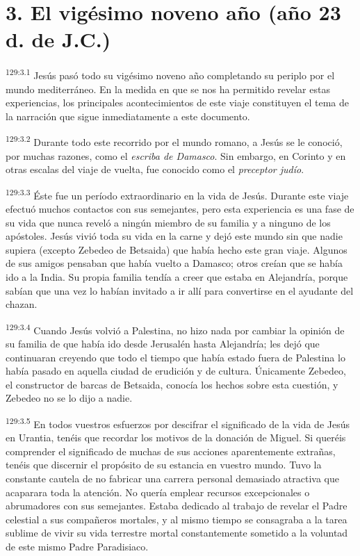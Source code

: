 \section*{3. El vigésimo noveno año (año 23 d. de J.C.)}
\par
\textsuperscript{129:3.1} Jesús pasó todo su vigésimo noveno año completando su periplo por el mundo mediterráneo. En la medida en que se nos ha permitido revelar estas experiencias, los principales acontecimientos de este viaje constituyen el tema de la narración que sigue inmediatamente a este documento.

\par
\textsuperscript{129:3.2} Durante todo este recorrido por el mundo romano, a Jesús se le conoció, por muchas razones, como el \textit{escriba de Damasco}. Sin embargo, en Corinto y en otras escalas del viaje de vuelta, fue conocido como el \textit{preceptor judío}.

\par
\textsuperscript{129:3.3} Éste fue un período extraordinario en la vida de Jesús. Durante este viaje efectuó muchos contactos con sus semejantes, pero esta experiencia es una fase de su vida que nunca reveló a ningún miembro de su familia y a ninguno de los apóstoles. Jesús vivió toda su vida en la carne y dejó este mundo sin que nadie supiera (excepto Zebedeo de Betsaida) que había hecho este gran viaje. Algunos de sus amigos pensaban que había vuelto a Damasco; otros creían que se había ido a la India. Su propia familia tendía a creer que estaba en Alejandría, porque sabían que una vez lo habían invitado a ir allí para convertirse en el ayudante del chazan.

\par
\textsuperscript{129:3.4} Cuando Jesús volvió a Palestina, no hizo nada por cambiar la opinión de su familia de que había ido desde Jerusalén hasta Alejandría; les dejó que continuaran creyendo que todo el tiempo que había estado fuera de Palestina lo había pasado en aquella ciudad de erudición y de cultura. Únicamente Zebedeo, el constructor de barcas de Betsaida, conocía los hechos sobre esta cuestión, y Zebedeo no se lo dijo a nadie.

\par
\textsuperscript{129:3.5} En todos vuestros esfuerzos por descifrar el significado de la vida de Jesús en Urantia, tenéis que recordar los motivos de la donación de Miguel. Si queréis comprender el significado de muchas de sus acciones aparentemente extrañas, tenéis que discernir el propósito de su estancia en vuestro mundo. Tuvo la constante cautela de no fabricar una carrera personal demasiado atractiva que acaparara toda la atención. No quería emplear recursos excepcionales o abrumadores con sus semejantes. Estaba dedicado al trabajo de revelar el Padre celestial a sus compañeros mortales, y al mismo tiempo se consagraba a la tarea sublime de vivir su vida terrestre mortal constantemente sometido a la voluntad de este mismo Padre Paradisiaco.

